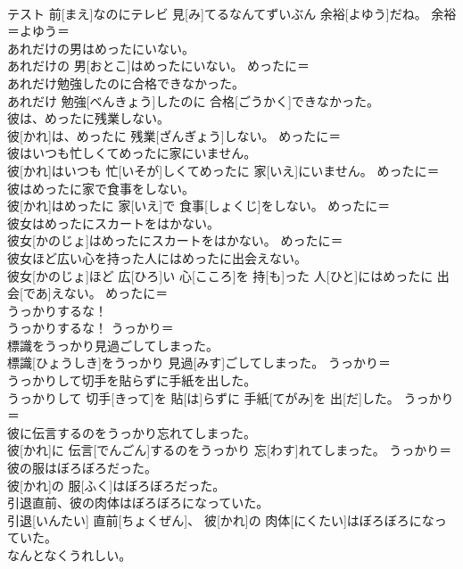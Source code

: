 \documentclass[8pt]{extreport}
\begin{document}
\begin{CJK}{UTF8}{min}
\\	テスト 前[まえ]なのにテレビ 見[み]てるなんてずいぶん 余裕[よゆう]だね。	余裕＝よゆう＝ 
\\	あれだけの男はめったにいない。	
\\	あれだけの 男[おとこ]はめったにいない。	めったに＝ 
\\	あれだけ勉強したのに合格できなかった。	
\\	あれだけ 勉強[べんきょう]したのに 合格[ごうかく]できなかった。	
\\	彼は、めったに残業しない。	
\\	彼[かれ]は、めったに 残業[ざんぎょう]しない。	めったに＝ 
\\	彼はいつも忙しくてめったに家にいません。	
\\	彼[かれ]はいつも 忙[いそが]しくてめったに 家[いえ]にいません。	めったに＝ 
\\	彼はめったに家で食事をしない。	
\\	彼[かれ]はめったに 家[いえ]で 食事[しょくじ]をしない。	めったに＝ 
\\	彼女はめったにスカートをはかない。	
\\	彼女[かのじょ]はめったにスカートをはかない。	めったに＝ 
\\	彼女ほど広い心を持った人にはめったに出会えない。	
\\	彼女[かのじょ]ほど 広[ひろ]い 心[こころ]を 持[も]った 人[ひと]にはめったに 出会[であ]えない。	めったに＝ 
\\	うっかりするな！	
\\	うっかりするな！	うっかり＝ 
\\	標識をうっかり見過ごしてしまった。	
\\	標識[ひょうしき]をうっかり 見過[みす]ごしてしまった。	うっかり＝ 
\\	うっかりして切手を貼らずに手紙を出した。	
\\	うっかりして 切手[きって]を 貼[は]らずに 手紙[てがみ]を 出[だ]した。	うっかり＝ 
\\	彼に伝言するのをうっかり忘れてしまった。	
\\	彼[かれ]に 伝言[でんごん]するのをうっかり 忘[わす]れてしまった。	うっかり＝ 
\\	彼の服はぼろぼろだった。	
\\	彼[かれ]の 服[ふく]はぼろぼろだった。	
\\	引退直前、彼の肉体はぼろぼろになっていた。	
\\	引退[いんたい] 直前[ちょくぜん]、 彼[かれ]の 肉体[にくたい]はぼろぼろになっていた。	
\\	なんとなくうれしい。	

\end{CJK}
\end{document}
